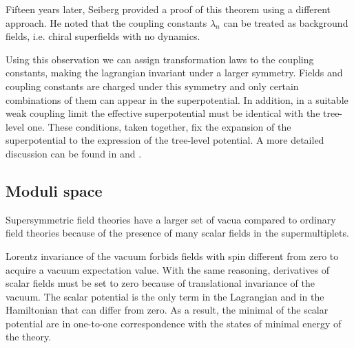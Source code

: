 Fifteen years later, Seiberg \cite{Seiberg:1993vc} provided a proof of this theorem using a different approach.
He noted that the coupling constants $\lambda_n$ can be treated as background fields, i.e. chiral superfields with no dynamics.

Using this observation we can assign transformation laws to the coupling constants, making the lagrangian invariant under a larger symmetry.
Fields and coupling constants are charged under this symmetry and only certain combinations of them can appear in the superpotential.
In addition, in a suitable weak coupling limit the effective superpotential must be identical with the tree-level one.
These conditions, taken together, fix the expansion of the superpotential to the expression of the tree-level potential.
A more detailed discussion can be found in \cite{Seiberg:1994bp} and \cite{Intriligator:1995au}.











\subsection{Moduli space}
Supersymmetric field theories have a larger set of vacua compared to ordinary field theories because of the presence of many scalar fields in the supermultiplets.

Lorentz invariance of the vacuum forbids fields with spin different from zero to acquire a vacuum expectation value.
With the same reasoning, derivatives of scalar fields must be set to zero because of translational invariance of the vacuum.
The scalar potential is the only term in the Lagrangian and in the Hamiltonian that can differ from zero.
As a result, the minimal of the scalar potential are in one-to-one correspondence with the states of minimal energy of the theory.


